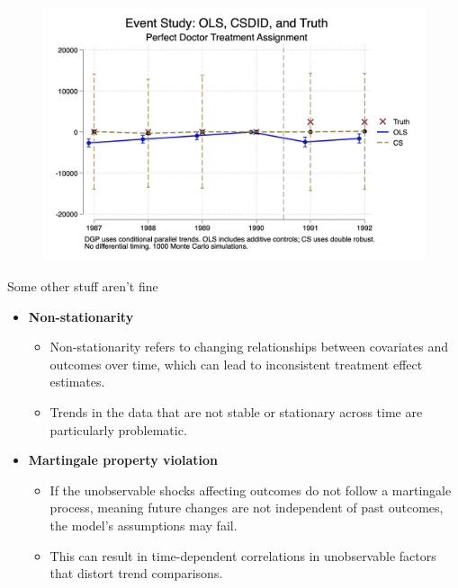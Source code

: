 \documentclass{beamer}
\begin{document}
\begin{frame}
 
\begin{figure}
    \centering
    \includegraphics[width=\textwidth]{./lecture_includes/selection_roy}
\end{figure}

\end{frame}




\begin{frame}{Some other stuff aren't fine}

\footnotesize
\begin{itemize}
    
    \item \textbf{Non-stationarity}
    \begin{itemize}
        \item Non-stationarity refers to changing relationships between covariates and outcomes over time, which can lead to inconsistent treatment effect estimates.
        \item Trends in the data that are not stable or stationary across time are particularly problematic.
    \end{itemize}
    
    \item \textbf{Martingale property violation}
    \begin{itemize}
        \item If the unobservable shocks affecting outcomes do not follow a martingale process, meaning future changes are not independent of past outcomes, the model's assumptions may fail.
        \item This can result in time-dependent correlations in unobservable factors that distort trend comparisons.
    \end{itemize}
\end{itemize}
\end{frame}
\end{document}
